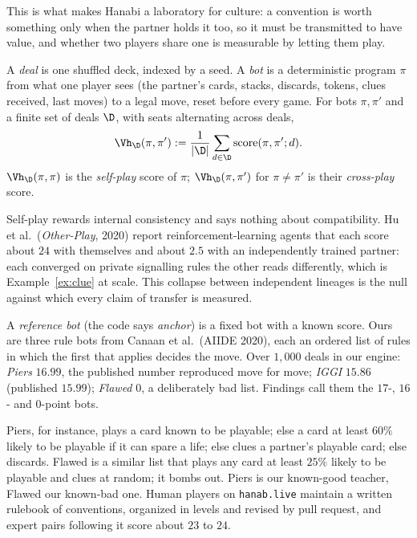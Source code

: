 \documentclass[11pt]{article}
\numberwithin{theorem}{section}
\theoremstyle{definition}
\begin{document}
This is what makes Hanabi a laboratory for culture: a convention is worth something only when the partner holds it
too, so it must be transmitted to have value, and whether two players share one is measurable by letting them play.

\begin{definition}
A \emph{deal} is one shuffled deck, indexed by a seed. A \emph{bot} is a deterministic program $\pi$ from what one
player sees (the partner's cards, stacks, discards, tokens, clues received, last moves) to a legal move, reset before
every game. For bots $\pi,\pi'$ and a finite set of deals $\D$, with seats alternating across deals,
\[
\Vh_{\D}(\pi,\pi') := \frac{1}{|\D|}\sum_{d\in\D}\mathrm{score}(\pi,\pi';d).
\]
$\Vh_{\D}(\pi,\pi)$ is the \emph{self-play} score of $\pi$; $\Vh_{\D}(\pi,\pi')$ for $\pi\neq\pi'$ is their
\emph{cross-play} score.
\end{definition}

\begin{remark}
Self-play rewards internal consistency and says nothing about compatibility. Hu et al.\ (\emph{Other-Play}, 2020)
report reinforcement-learning agents that each score about $24$ with themselves and about $2.5$ with an independently
trained partner: each converged on private signalling rules the other reads differently, which is
Example~\ref{ex:clue} at scale. This collapse between independent lineages is the null against which every claim of
transfer is measured.
\end{remark}

\begin{definition}
A \emph{reference bot} (the code says \emph{anchor}) is a fixed bot with a known score. Ours are three rule bots from
Canaan et al.\ (AIIDE 2020), each an ordered list of rules in which the first that applies decides the move. Over
$1{,}000$ deals in our engine: \emph{Piers} $16.99$, the published number reproduced move for move; \emph{IGGI}
$15.86$ (published $15.99$); \emph{Flawed} $0$, a deliberately bad list.
Findings call them the $17$-, $16$- and $0$-point bots.
\end{definition}

Piers, for instance, plays a card known to be playable; else a card at least $60\%$ likely to be playable if it can
spare a life; else clues a partner's playable card; else discards. Flawed is a similar list that plays any card at least
$25\%$ likely to be playable and clues at random; it bombs out. Piers is our known-good teacher, Flawed our known-bad
one. Human players on \texttt{hanab.live} maintain a written rulebook of
conventions, organized in levels and revised by pull request, and expert pairs following it score about $23$ to $24$.
\end{document}

